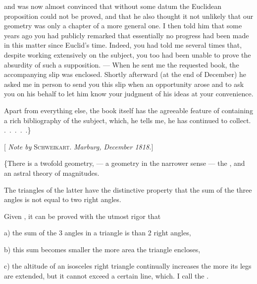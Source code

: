 and was now almost convinced that without some datum the Euclidean proposition could not be proved, and that he also thought it not unlikely that our geometry was only a chapter of a more general one. I then told him that some years ago you had publicly remarked that essentially no progress had been made in this matter since Euclid's time. Indeed, you had told me several times that, despite working extensively on the subject, you too had been unable to prove the absurdity of such a supposition. --- When he sent me the requested book, the accompanying slip was enclosed. Shortly afterward (at the end of December) he asked me in person to send you this slip when an opportunity arose and to ask you on his behalf to let him know your judgment of his ideas at your convenience.

Apart from everything else, the book itself has the agreeable feature of containing a rich bibliography of the subject, which, he tells me, he has continued to collect. .\ .\ .\ .\ .\}

\bigskip
\noindent\hrulefill
\bigskip

\begin{center}[\emph{ Note by} \textsc{Schweikart}. \emph{Marburg, December 1818.}]\end{center}

\{There is a twofold geometry, --- a geometry in the narrower sense --- the , and an astral theory of magnitudes.

The triangles of the latter have the distinctive property that the sum of the three angles is not equal to two right angles.

Given , it can be proved with the utmost rigor that

a) the sum of the 3 angles in a triangle is  than 2 right angles,

b) this sum becomes smaller the more area the triangle encloses,

c) the altitude of an isosceles right triangle continually increases the more its legs are extended, but it cannot exceed a certain line, which. I call the .

